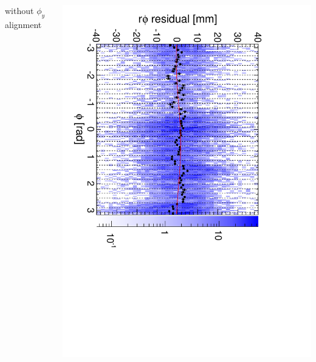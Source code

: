\documentclass[compress]{beamer}
\begin{document}
\begin{frame}
\begin{columns}
\centering without $\phi_y$ alignment

\includegraphics[height=\linewidth, angle=90]{diskiter02_phiyzero_m2to1outer.pdf}
\end{columns}
\end{frame}
\end{document}
